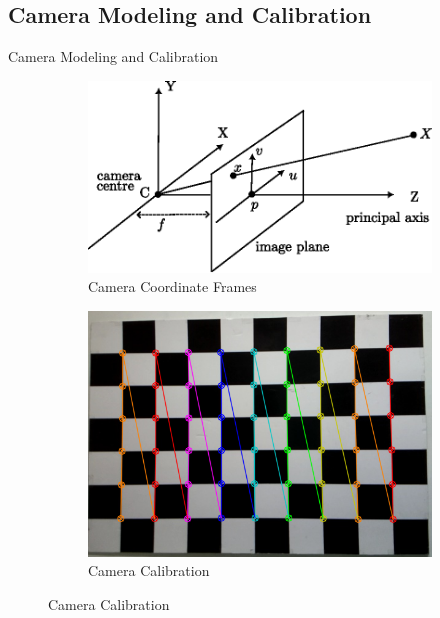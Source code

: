 \documentclass[10pt]{beamer}
\begin{document}
\subsection*{Camera Modeling and Calibration}
\begin{frame}{Camera Modeling and Calibration}
    \begin{figure}[!h]
        \centering
        \begin{subfigure}[b]{0.45\textwidth}
            \centering
            \includegraphics[scale=0.45]{cam_model.eps}
            \caption{Camera Coordinate Frames}
            \label{fig: Camera_coordinate}
        \end{subfigure}
        \hspace{1pt}
        \begin{subfigure}[b]{0.45\textwidth}
            \centering
            \includegraphics[scale=0.17]{CAm-cal.png}
            \caption{Camera Calibration}
            \label{fig: cam_cal}
        \end{subfigure}

\end{figure}
\end{frame}
\end{document}
